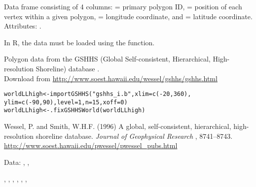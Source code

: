 \documentclass[letterpaper]{book}
\begin{document}
%
\begin{Format}
Data frame consisting of 4 columns:  = primary polygon ID,
 = position of each vertex within a given polygon, 
= longitude coordinate, and  = latitude coordinate. Attributes:
.
\end{Format}
%
\begin{Note}\relax
In R, the data must be loaded using the  function.
\end{Note}
%
\begin{Source}\relax
Polygon data from the GSHHS (Global Self-consistent, Hierarchical,
High-resolution Shoreline) database . \\{}
Download from \url{http://www.soest.hawaii.edu/wessel/gshhs/gshhs.html}

\begin{alltt}
worldLLhigh <-importGSHHS("gshhs_i.b", xlim=c(-20,360),
                 ylim=c(-90,90), level=1, n=15, xoff=0)
worldLLhigh <- .fixGSHHSWorld(worldLLhigh)
\end{alltt}

\end{Source}
%
\begin{References}\relax
Wessel, P. and Smith, W.H.F. (1996) A global, self-consistent,
hierarchical, high-resolution shoreline database. \emph{Journal of
Geophysical Research} , 8741--8743. \\{}
\url{http://www.soest.hawaii.edu/pwessel/pwessel_pubs.html}
\end{References}
%
\begin{SeeAlso}\relax
Data:  , , 

, , ,
, , ,
\end{SeeAlso}
\printindex{}
\end{document}
